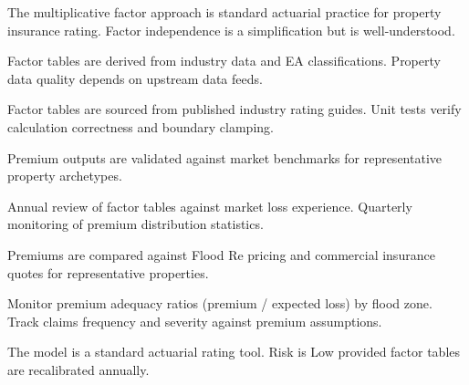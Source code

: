 \documentclass[11pt,a4paper]{article}
\begin{document}
The multiplicative factor approach is standard actuarial practice for property
insurance rating. Factor independence is a simplification but is well-understood.

Factor tables are derived from industry data and EA classifications. Property
data quality depends on upstream data feeds.

Factor tables are sourced from published industry rating guides. Unit tests
verify calculation correctness and boundary clamping.

Premium outputs are validated against market benchmarks for representative
property archetypes.

Annual review of factor tables against market loss experience. Quarterly
monitoring of premium distribution statistics.

Premiums are compared against Flood Re pricing and commercial insurance quotes
for representative properties.

Monitor premium adequacy ratios (premium / expected loss) by flood zone.
Track claims frequency and severity against premium assumptions.

The model is a standard actuarial rating tool. Risk is Low provided factor
tables are recalibrated annually.
\end{document}
